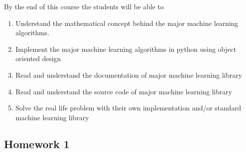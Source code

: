 \documentclass[11pt]{article}
\theoremstyle{definition}
\begin{document}
By the end of this course the students will be able to 
\begin{enumerate}
    \item Understand the mathematical concept behind the major machine learning algorithms. 
    
    \item Implement the major machine learning algorithms in python using object oriented design 
    
    \item Read and understand the documentation of major machine learning library 
    
    \item Read and understand the source code of major machine learning library
    
    \item Solve the real life problem with their own implementation and/or standard machine learning library 
\end{enumerate}

\newpage

\subsection*{Homework 1}
\end{document}

